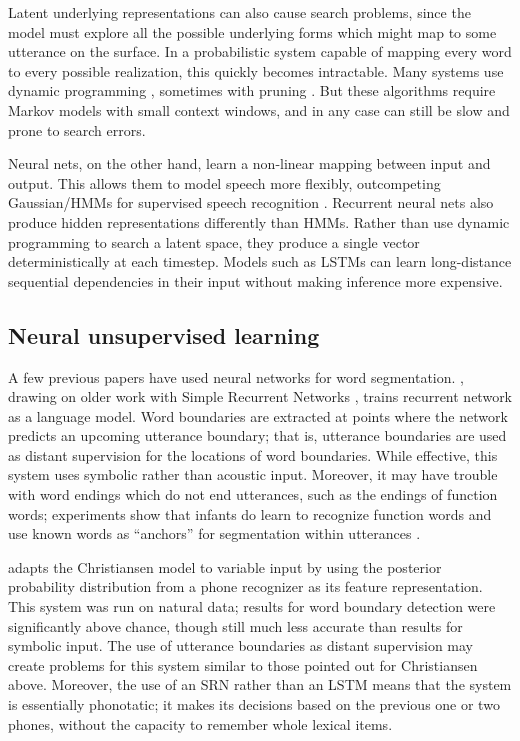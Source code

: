 \documentclass[11pt,letterpaper]{article}
\begin{document}
Latent underlying representations can also cause search problems,
since the model must explore all the possible underlying forms which
might map to some utterance on the surface. In a probabilistic system
capable of mapping every word to every possible realization, this
quickly becomes intractable. Many systems use dynamic programming
\cite{Mochihashi09,Neubig10}, sometimes with pruning
\cite{vanGael08}. But these algorithms require Markov models with
small context windows, and in any case can still be slow and prone to
search errors.

Neural nets, on the other hand, learn a non-linear mapping between
input and output. This allows them to model speech more flexibly,
outcompeting Gaussian/HMMs for supervised speech recognition
\cite{xxx}. Recurrent neural nets also produce hidden representations
differently than HMMs. Rather than use dynamic programming to search a
latent space, they produce a single vector deterministically at each
timestep. Models such as LSTMs \cite{Hochreiter97} can learn
long-distance sequential dependencies in their input without making
inference more expensive.

\subsection{Neural unsupervised learning}
\label{sub-neural}

A few previous papers have used neural networks for word
segmentation. , drawing on older work with
Simple Recurrent Networks \cite{Elman90}, trains recurrent network as
a language model. Word boundaries are extracted at points where the
network predicts an upcoming utterance boundary; that is, utterance
boundaries are used as distant supervision for the locations of word
boundaries. While effective, this system uses symbolic rather than
acoustic input. Moreover, it may have trouble with word endings which
do not end utterances, such as the endings of function words;
experiments show that infants do learn to recognize function words
\cite{xxx} and use known words as ``anchors'' for segmentation within
utterances \cite{Bortfeld05}.

 adapts the Christiansen model to variable input by
using the posterior probability distribution from a phone recognizer
as its feature representation. This system was run on natural data;
results for word boundary detection were significantly above chance,
though still much less accurate than results for symbolic input. The
use of utterance boundaries as distant supervision may create problems
for this system similar to those pointed out for Christiansen
above. Moreover, the use of an SRN rather than an LSTM means that the
system is essentially phonotatic; it makes its decisions based on the
previous one or two phones, without the capacity to remember whole
lexical items.
\end{document}

